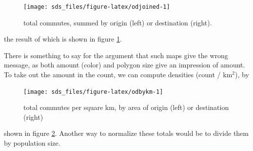 \documentclass[]{book}
\newenvironment{Shaded}{\begin{snugshade}}{\end{snugshade}}
\newcommand{\CommentTok}[1]{\textcolor[rgb]{0.56,0.35,0.01}{\textit{#1}}}
\newcommand{\DataTypeTok}[1]{\textcolor[rgb]{0.13,0.29,0.53}{#1}}
\newcommand{\DecValTok}[1]{\textcolor[rgb]{0.00,0.00,0.81}{#1}}
\newcommand{\KeywordTok}[1]{\textcolor[rgb]{0.13,0.29,0.53}{\textbf{#1}}}
\newcommand{\NormalTok}[1]{#1}
\newcommand{\OperatorTok}[1]{\textcolor[rgb]{0.81,0.36,0.00}{\textbf{#1}}}
\newcommand{\OtherTok}[1]{\textcolor[rgb]{0.56,0.35,0.01}{#1}}
\newcommand{\StringTok}[1]{\textcolor[rgb]{0.31,0.60,0.02}{#1}}
\begin{document}
\begin{figure}

{\centering \texttt{[image: sds\_files/figure-latex/odjoined-1]} 

}

\caption{total commutes, summed by origin (left) or destination (right).}\label{fig:odjoined}
\end{figure}

the result of which is shown in figure \ref{fig:odjoined}.

There is something to say for the argument that such maps
give the wrong message, as both amount (color) and polygon
size give an impression of amount. To take out the amount
in the count, we can compute densities (count / km\(^2\)), by

\begin{Shaded}
\end{Shaded}

\begin{figure}

{\centering \texttt{[image: sds\_files/figure-latex/odbykm-1]} 

}

\caption{total commutes per square km, by area of origin (left) or destination (right)}\label{fig:odbykm}
\end{figure}

shown in figure \ref{fig:odbykm}. Another way to normalize these
totals would be to divide them by population size.
\end{document}
